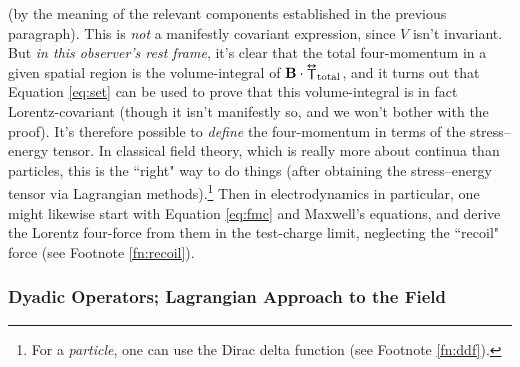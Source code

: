 \documentclass[12pt]{article}
\renewcommand{\vv}[1]{\mathbf{#1}}
\newcommand{\tightoverset}[2]{%
  \mathop{#2}\limits^{\vbox to -.5ex{\kern-0.75ex\hbox{$#1$}\vss}}}
\newcommand{\inlinedy}[1]{\tightoverset{\text{\tiny$\bm\leftrightarrow$}}{#1}}
\begin{document}
(by the meaning of the relevant components established in the previous paragraph). This is \emph{not} a manifestly covariant expression, since $V$ isn't invariant. But \emph{in this observer's rest frame}, it's clear that the total four-momentum in a given spatial region is the volume-integral of $\vv B \cdot {\inlinedy{\mathsf{T}}} _{\textrm{total}}$, and it turns out that Equation \ref{eq:set} can be used to prove that this volume-integral is in fact Lorentz-covariant (though it isn't manifestly so, and we won't bother with the proof). It's therefore possible to \emph{define} the four-momentum in terms of the stress--energy tensor. In classical field theory, which is really more about continua than particles, this is the ``right" way to do things (after obtaining the stress--energy tensor via Lagrangian methods).\footnote{For a \emph{particle}, one can use the Dirac delta function (see Footnote \ref{fn:ddf}).} Then in electrodynamics in particular, one might likewise start with Equation \ref{eq:fmc} and Maxwell's equations, and derive the Lorentz four-force from them in the test-charge limit, neglecting the ``recoil" force (see Footnote \ref{fn:recoil}).


\subsubsection{Dyadic Operators; Lagrangian Approach to the Field}
\end{document}
